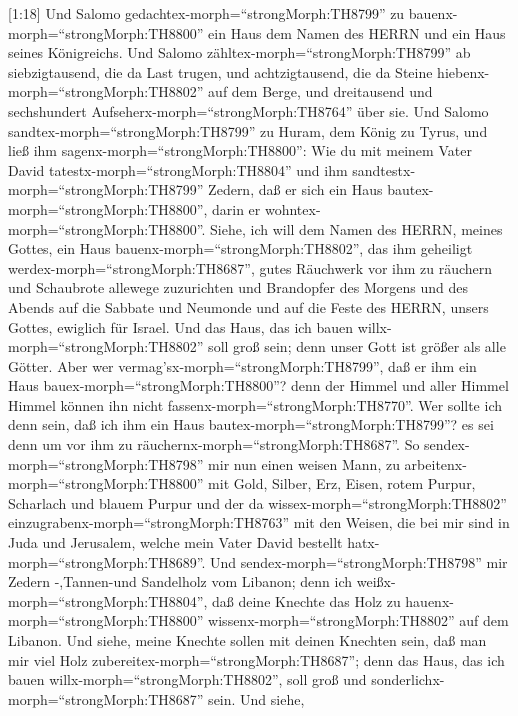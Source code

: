  {[}1:18{]} Und Salomo
gedachtex-morph=``strongMorph:TH8799'' zu
bauenx-morph=``strongMorph:TH8800'' ein Haus dem Namen des HERRN und ein
Haus seines Königreichs.  Und Salomo
zähltex-morph=``strongMorph:TH8799'' ab siebzigtausend, die da Last
trugen, und achtzigtausend, die da Steine
hiebenx-morph=``strongMorph:TH8802'' auf dem Berge, und dreitausend und
sechshundert Aufseherx-morph=``strongMorph:TH8764'' über sie.
 Und Salomo sandtex-morph=``strongMorph:TH8799'' zu Huram,
dem König zu Tyrus, und ließ ihm sagenx-morph=``strongMorph:TH8800'':
Wie du mit meinem Vater David tatestx-morph=``strongMorph:TH8804'' und
ihm sandtestx-morph=``strongMorph:TH8799'' Zedern, daß er sich ein Haus
bautex-morph=``strongMorph:TH8800'', darin er
wohntex-morph=``strongMorph:TH8800''.  Siehe, ich will dem
Namen des HERRN, meines Gottes, ein Haus
bauenx-morph=``strongMorph:TH8802'', das ihm geheiligt
werdex-morph=``strongMorph:TH8687'', gutes Räuchwerk vor ihm zu räuchern
und Schaubrote allewege zuzurichten und Brandopfer des Morgens und des
Abends auf die Sabbate und Neumonde und auf die Feste des HERRN, unsers
Gottes, ewiglich für Israel.  Und das Haus, das ich bauen
willx-morph=``strongMorph:TH8802'' soll groß sein; denn unser Gott ist
größer als alle Götter.  Aber wer
vermag'sx-morph=``strongMorph:TH8799'', daß er ihm ein Haus
bauex-morph=``strongMorph:TH8800''? denn der Himmel und aller Himmel
Himmel können ihn nicht fassenx-morph=``strongMorph:TH8770''. Wer sollte
ich denn sein, daß ich ihm ein Haus bautex-morph=``strongMorph:TH8799''?
es sei denn um vor ihm zu räuchernx-morph=``strongMorph:TH8687''.
 So sendex-morph=``strongMorph:TH8798'' mir nun einen weisen
Mann, zu arbeitenx-morph=``strongMorph:TH8800'' mit Gold, Silber, Erz,
Eisen, rotem Purpur, Scharlach und blauem Purpur und der da
wissex-morph=``strongMorph:TH8802''
einzugrabenx-morph=``strongMorph:TH8763'' mit den Weisen, die bei mir
sind in Juda und Jerusalem, welche mein Vater David bestellt
hatx-morph=``strongMorph:TH8689''.  Und
sendex-morph=``strongMorph:TH8798'' mir Zedern -,Tannen-und Sandelholz
vom Libanon; denn ich weißx-morph=``strongMorph:TH8804'', daß deine
Knechte das Holz zu hauenx-morph=``strongMorph:TH8800''
wissenx-morph=``strongMorph:TH8802'' auf dem Libanon. Und siehe, meine
Knechte sollen mit deinen Knechten sein,  daß man mir viel
Holz zubereitex-morph=``strongMorph:TH8687''; denn das Haus, das ich
bauen willx-morph=``strongMorph:TH8802'', soll groß und
sonderlichx-morph=``strongMorph:TH8687'' sein.  Und siehe,
